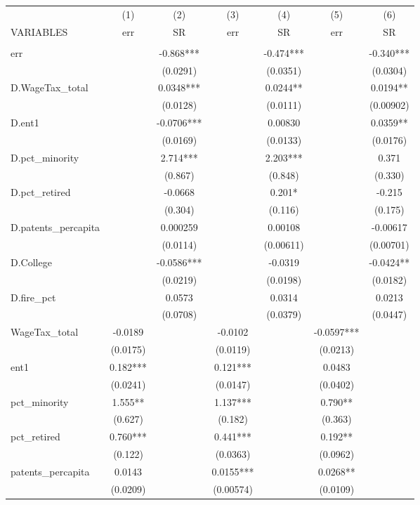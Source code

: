 \begin{tabular}{lcccccc} \hline
 & (1) & (2) & (3) & (4) & (5) & (6) \\
VARIABLES & err & SR & err & SR & err & SR \\ \hline
 &  &  &  &  &  &  \\
err &  & -0.868*** &  & -0.474*** &  & -0.340*** \\
 &  & (0.0291) &  & (0.0351) &  & (0.0304) \\
D.WageTax\_total &  & 0.0348*** &  & 0.0244** &  & 0.0194** \\
 &  & (0.0128) &  & (0.0111) &  & (0.00902) \\
D.ent1 &  & -0.0706*** &  & 0.00830 &  & 0.0359** \\
 &  & (0.0169) &  & (0.0133) &  & (0.0176) \\
D.pct\_minority &  & 2.714*** &  & 2.203*** &  & 0.371 \\
 &  & (0.867) &  & (0.848) &  & (0.330) \\
D.pct\_retired &  & -0.0668 &  & 0.201* &  & -0.215 \\
 &  & (0.304) &  & (0.116) &  & (0.175) \\
D.patents\_percapita &  & 0.000259 &  & 0.00108 &  & -0.00617 \\
 &  & (0.0114) &  & (0.00611) &  & (0.00701) \\
D.College &  & -0.0586*** &  & -0.0319 &  & -0.0424** \\
 &  & (0.0219) &  & (0.0198) &  & (0.0182) \\
D.fire\_pct &  & 0.0573 &  & 0.0314 &  & 0.0213 \\
 &  & (0.0708) &  & (0.0379) &  & (0.0447) \\
WageTax\_total & -0.0189 &  & -0.0102 &  & -0.0597*** &  \\
 & (0.0175) &  & (0.0119) &  & (0.0213) &  \\
ent1 & 0.182*** &  & 0.121*** &  & 0.0483 &  \\
 & (0.0241) &  & (0.0147) &  & (0.0402) &  \\
pct\_minority & 1.555** &  & 1.137*** &  & 0.790** &  \\
 & (0.627) &  & (0.182) &  & (0.363) &  \\
pct\_retired & 0.760*** &  & 0.441*** &  & 0.192** &  \\
 & (0.122) &  & (0.0363) &  & (0.0962) &  \\
patents\_percapita & 0.0143 &  & 0.0155*** &  & 0.0268** &  \\
 & (0.0209) &  & (0.00574) &  & (0.0109) &  \\

\end{tabular}
